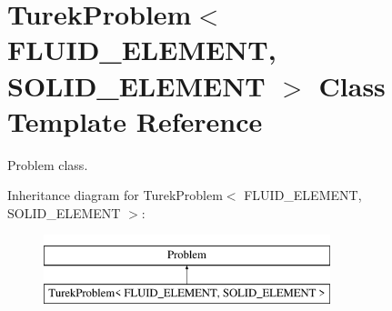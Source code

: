 \hypertarget{classTurekProblem}{}\section{Turek\+Problem$<$ F\+L\+U\+I\+D\+\_\+\+E\+L\+E\+M\+E\+NT, S\+O\+L\+I\+D\+\_\+\+E\+L\+E\+M\+E\+NT $>$ Class Template Reference}
\label{classTurekProblem}


Problem class.  


Inheritance diagram for Turek\+Problem$<$ F\+L\+U\+I\+D\+\_\+\+E\+L\+E\+M\+E\+NT, S\+O\+L\+I\+D\+\_\+\+E\+L\+E\+M\+E\+NT $>$\+:\begin{figure}[H]
\begin{center}
\leavevmode
\includegraphics[height=2.000000cm]{classTurekProblem}
\end{center}
\end{figure}
